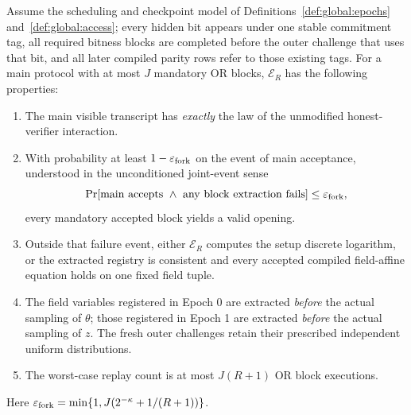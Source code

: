 \begin{theorem}\label{thm:global:chronological}
Assume the scheduling and checkpoint
model of Definitions~\ref{def:global:epochs}
and~\ref{def:global:access}; every
hidden bit appears under one stable
commitment tag, all required bitness
blocks are completed before the outer
challenge that uses that bit, and
all later compiled parity rows refer
to those existing tags.
For a main protocol with at most $J$
mandatory OR blocks, $\mathcal E_R$
has the following properties:
\begin{enumerate}[label=\textup{(\roman*)}]
\item The main visible transcript has
\emph{exactly} the law of the unmodified
honest-verifier interaction.
\item With probability at least
$1-\varepsilon_{\rm fork}$ on
the event of main acceptance,
understood in the unconditioned
joint-event sense
\[
 \Pr[\mathrm{main\ accepts}\ \wedge\
 \mathrm{any\ block\ extraction\ fails}]
 \le\varepsilon_{\rm fork},
\]
every mandatory accepted block yields
a valid opening.
\item Outside that failure event, either
$\mathcal E_R$ computes the setup
discrete logarithm, or the extracted
registry is consistent and every
accepted compiled field-affine
equation holds on one fixed field
tuple.
\item The field variables registered
in Epoch 0 are extracted
\emph{before} the actual sampling
of $\theta$; those registered in
Epoch 1 are extracted
\emph{before} the actual sampling
of $z$. The fresh outer challenges
retain their prescribed independent
uniform distributions.
\item The worst-case replay count is
at most $J(R+1)$ OR block executions.
\end{enumerate}
Here
$\varepsilon_{\rm fork}=
\min\{1,J(2^{-\kappa}+1/(R+1))\}$.
\end{theorem}
